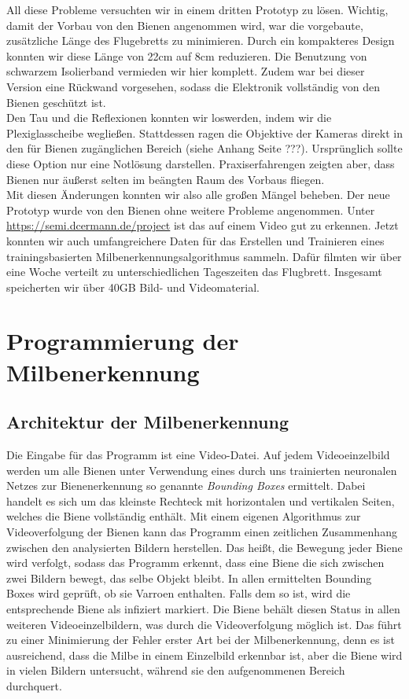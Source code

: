 \documentclass[11pt,a4paper]{article}
\begin{document}
All diese Probleme versuchten wir in einem dritten Prototyp zu lösen. Wichtig, damit der Vorbau von den Bienen angenommen wird, war die vorgebaute, zusätzliche Länge des Flugebretts zu minimieren. Durch ein kompakteres Design konnten wir diese Länge von 22cm auf 8cm reduzieren. Die Benutzung von schwarzem Isolierband vermieden wir hier komplett. Zudem war bei dieser Version eine Rückwand vorgesehen, sodass die Elektronik vollständig von den Bienen geschützt ist.\\
Den Tau und die Reflexionen konnten wir loswerden, indem wir die Plexiglasscheibe wegließen. Stattdessen ragen die Objektive der Kameras direkt in den für Bienen zugänglichen Bereich (siehe Anhang Seite ???). Ursprünglich sollte diese Option nur eine Notlösung darstellen. Praxiserfahrengen zeigten aber, dass Bienen nur äußerst selten im beängten Raum des Vorbaus fliegen.\\
Mit diesen Änderungen konnten wir also alle großen Mängel beheben. Der neue Prototyp wurde von den Bienen ohne weitere Probleme angenommen. Unter \url{https://semi.dcermann.de/project} ist das auf einem Video gut zu erkennen. Jetzt konnten wir auch umfangreichere Daten für das Erstellen und Trainieren eines trainingsbasierten Milbenerkennungsalgorithmus sammeln. Dafür filmten wir über eine Woche verteilt zu unterschiedlichen Tageszeiten das Flugbrett. Insgesamt speicherten wir über 40GB Bild- und Videomaterial.\\


\newpage
\section{Programmierung der Milbenerkennung} \label{section:Programmierung}
\subsection{Architektur der Milbenerkennung}
Die Eingabe für das Programm ist eine Video-Datei. Auf jedem Videoeinzelbild werden um alle Bienen unter Verwendung eines durch uns trainierten neuronalen Netzes zur Bienenerkennung so genannte \textit{Bounding Boxes} ermittelt. Dabei handelt es sich um das kleinste Rechteck mit horizontalen und vertikalen Seiten, welches die Biene vollständig enthält. Mit einem eigenen Algorithmus zur Videoverfolgung der Bienen kann das Programm einen zeitlichen Zusammenhang zwischen den analysierten Bildern herstellen. Das heißt, die Bewegung jeder Biene wird verfolgt, sodass das Programm erkennt, dass eine Biene die sich zwischen zwei Bildern bewegt, das selbe Objekt bleibt. In allen ermittelten Bounding Boxes wird geprüft, ob sie Varroen enthalten. Falls dem so ist, wird die entsprechende Biene als infiziert markiert. Die Biene behält diesen Status in allen weiteren Videoeinzelbildern, was durch die Videoverfolgung möglich ist. Das führt zu einer Minimierung der Fehler erster Art bei der Milbenerkennung, denn es ist ausreichend, dass die Milbe in einem Einzelbild erkennbar ist, aber die Biene wird in vielen Bildern untersucht, während sie den aufgenommenen Bereich durchquert.
\end{document}
